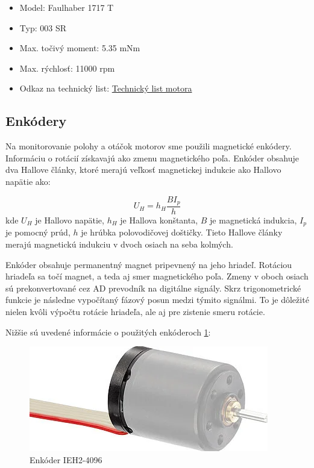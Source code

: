 \begin{itemize}
  \item Model: Faulhaber 1717 T 
  \item Typ: 003 SR
  \item Max. točivý moment: 5.35 mNm
  \item Max. rýchlosť: 11000 rpm
  \item Odkaz na technický list: \href{https://www.faulhaber.com/fileadmin/Import/Media/EN_1717_SR_DFF.pdf}{Technický list motora}
\end{itemize}

\subsection{Enkódery}
Na monitorovanie polohy a otáčok motorov sme použili magnetické enkódery. Informáciu o rotácií získavajú ako zmenu magnetického poľa. Enkóder obsahuje dva Hallove články, ktoré merajú veľkosť magnetickej indukcie ako Hallovo napätie ako: 



\begin{equation}
\label{enc_eq}
U_H = h_H \frac{BI_p}{h}
\end{equation}
kde $U_H$ je Hallovo napätie, $h_H$ je Hallova konštanta, $B$ je magnetická indukcia, $I_p$ je pomocný prúd, $h$ je hrúbka polovodičovej doštičky. Tieto Hallove články merajú magnetickú indukciu v dvoch osiach na seba kolmých.



Enkóder obsahuje permanentný magnet pripevnený na jeho hriadeľ. Rotáciou hriadeľa sa točí magnet, a teda aj smer magnetického poľa. Zmeny v oboch osiach sú prekonvertované cez AD prevodník na digitálne signály. Skrz trigonometrické funkcie je následne vypočítaný fázový posun medzi týmito signálmi. To je dôležité nielen kvôli výpočtu rotácie hriadeľa, ale aj pre zistenie smeru rotácie.

Nižšie sú uvedené informácie o použitých enkóderoch \ref{fig:encoder}:

\begin{figure}[!htbp]
        \centering
        \includegraphics[scale=0.8]{includes/images/encoder.png}
        \caption{Enkóder IEH2-4096}
        \label{fig:encoder}
\end{figure}

